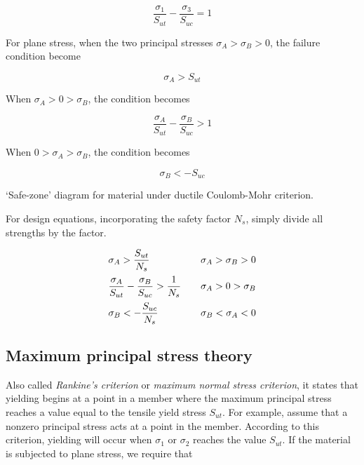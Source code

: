\documentclass[
fontsize=10pt,
a4paper,
twosides=false,
open=any,
svgnames,
]{kaobook} %
\begin{document}
\[\frac{\sigma_1}{S_{ut}} - \frac{\sigma_3}{S_{uc}} = 1\]

For plane stress, when the two principal stresses $\sigma_A > \sigma_B > 0$, the failure condition become

\[\sigma_A > S_{ut}\]

When  $\sigma_A > 0 > \sigma_B$, the condition becomes

\[\frac{\sigma_A}{S_{ut}} - \frac{\sigma_B}{S_{uc}} > 1\]

When  $0 > \sigma_A > \sigma_B$, the condition becomes

\[\sigma_B <  - S_{uc}\]

\begin{marginfigure}
  \centering
  \caption{`Safe-zone' diagram for material under ductile Coulomb-Mohr criterion.}
  \label{fig: Coulomb-Mohr ductile safe zone}
\end{marginfigure}

For design equations, incorporating the safety factor $N_s$, simply divide all strengths by the factor.

\begin{equation}
  \begin{array}{l l l}
  \sigma_A > \dfrac{S_{ut}}{N_s} & & \sigma_A > \sigma_B > 0 \\[10pt]
  \dfrac{\sigma_A}{S_{ut}} - \dfrac{\sigma_B}{S_{uc}} > \dfrac{1}{N_s} & & \sigma_A > 0 > \sigma_B \\[10pt]
    \sigma_B <  -\dfrac{S_{uc}}{N_s} & & \sigma_B < \sigma_A < 0
  \end{array}
\end{equation}

\subsection{Maximum principal stress theory}

Also called \emph{Rankine’s criterion} or \emph{maximum normal stress criterion}, it states that yielding begins at a point in a member where the maximum principal stress reaches a value equal to the tensile yield stress $S_{ut}$. For example, assume that a nonzero principal stress acts at a point in the member. According to this criterion, yielding will occur when $\sigma_1$ or $\sigma_2$ reaches the value $S_{ut}$. If the material is subjected to plane stress, we require that
\end{document}
